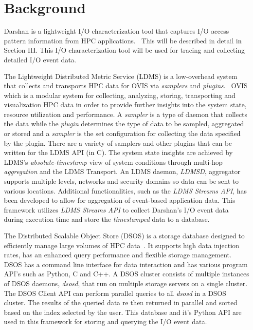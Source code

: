 \section{Background}
Darshan is a lightweight I/O characterization tool that captures I/O access pattern information from HPC applications.~\cite{Darshan} This will be described in detail in Section III. This I/O characterization tool will be used for tracing and collecting detailed I/O event data.

The Lightweight Distributed Metric Service (LDMS) is a low-overhead system that collects and transports HPC data for OVIS via \emph{samplers} and \emph{plugins}.~\cite{ovisweb} OVIS which is a modular system for collecting, analyzing, storing, transporting and visualization HPC data in order to provide further insights into the system state, resource utilization and performance. A \emph{sampler} is a type of daemon that collects the data while the \emph{plugin} determines the type of data to be sampled, aggregated or stored and a \emph{sampler} is the set configuration for collecting the data specified by the plugin. There are a variety of samplers and other plugins that can be written for the LDMS API (in C). The system state insights are achieved by LDMS's \emph{absolute-timestamp} view of system conditions through multi-hop \emph{aggregation} and the LDMS Transport. An LDMS daemon, \emph{LDMSD}, aggregator supports multiple levels, networks and security domains so data can be sent to various locations. Additional functionalities, such as the \emph{LDMS Streams API}, has been developed to allow for aggregation of event-based application data. This framework utilizes \emph{LDMS Streams API} to collect Darshan's I/O event data during execution time and store the \emph{timestamped} data to a database.

The Distributed Scalable Object Store (DSOS) is a storage database designed to efficiently manage large volumes of HPC data~\cite{sosgithub}. It supports high data injection rates, has an enhanced query performance and flexible storage management. DSOS has a command line interface for data interaction and has various program API's such as Python, C and C++. A DSOS cluster consists of multiple instances of DSOS daemons, \emph{dsosd}, that run on multiple storage servers on a single cluster. The DSOS Client API can perform parallel queries to all \emph{dsosd} in a DSOS cluster. The results of the queried data re then returned in parallel and sorted based on the index selected by the user. This database and it's Python API are used in this framework for storing and querying the I/O event data. 

